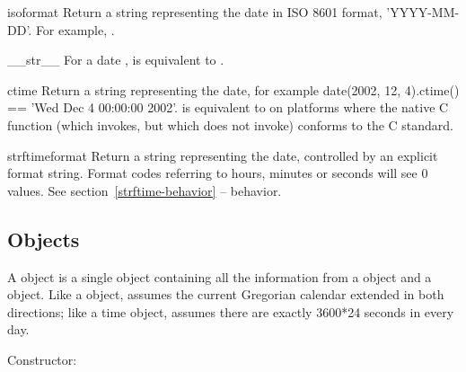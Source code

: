 \begin{methoddesc}{isoformat}{}
  Return a string representing the date in ISO 8601 format,
  'YYYY-MM-DD'.  For example,
  .
\end{methoddesc}

\begin{methoddesc}{__str__}{}
  For a date ,  is equivalent to
  .
\end{methoddesc}

\begin{methoddesc}{ctime}{}
  Return a string representing the date, for example
  date(2002, 12, 4).ctime() == 'Wed Dec  4 00:00:00 2002'.
   is equivalent to
  on platforms where the native C  function
  (which  invokes, but which
   does not invoke) conforms to the C standard.
\end{methoddesc}

\begin{methoddesc}{strftime}{format}
  Return a string representing the date, controlled by an explicit
  format string.  Format codes referring to hours, minutes or seconds
  will see 0 values.
  See section~\ref{strftime-behavior} --  behavior.
\end{methoddesc}


\subsection{ Objects \label{datetime-datetime}}

A  object is a single object containing all the
information from a  object and a  object.  Like a
 object,  assumes the current Gregorian
calendar extended in both directions; like a time object,
 assumes there are exactly 3600*24 seconds in every
day.

Constructor:

